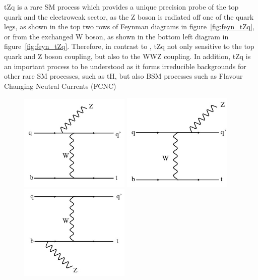 tZq is a rare SM process which provides a unique precision probe of the top quark and the electroweak sector, as the Z boson is radiated off one of the quark legs, as shown in the top two rows of Feynman diagrams in figure~\ref{fig:feyn_tZq}, or from the exchanged W boson, as shown in the bottom left diagram in figure~\ref{fig:feyn_tZq}.
Therefore, in contrast to \ttZ, tZq not only sensitive to the top quark and Z boson coupling, but also to the WWZ coupling.
In addition, tZq is an important process to be understood as it forms irreducible backgrounds for other rare SM processes, such as tH, but also BSM processes such as Flavour Changing Neutral Currents (FCNC)~\cite{AguilarSaavedra:2004wm}

\begin{figure}[htbp]
\centering
\includegraphics[width=0.47\textwidth]{figs/top-physics/tZq_feyn1.jpg}
\includegraphics[width=0.47\textwidth]{figs/top-physics/tZq_feyn2.jpg}
\includegraphics[width=0.47\textwidth]{figs/top-physics/tZq_feyn3.jpg}

\end{figure}
